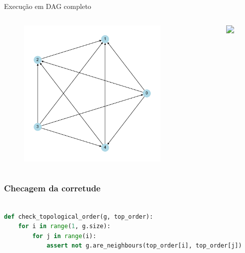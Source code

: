 \documentclass[aspectratio=169,usenames,dvipsnames]{beamer}
\begin{document}
\begin{frame}{Execução em DAG completo}

  \begin{columns}[t]
  \begin{figure}[ht]
  \centering
  \includegraphics[width=0.9\textwidth]{figs/dag_complete_5.pdf}
  \end{figure}
  \vfill
  \begin{figure}[h]
  \centering
  \includegraphics<2>[width=0.9\textwidth]{figs/dag_complete_top_5.png}
  \end{figure}
  \vfill
  \end{columns}
  
\end{frame}

\begin{frame}[fragile]  %
  \frametitle{Checagem da corretude}

      \begin{lstlisting}[language=Python, basicstyle=\ttfamily\small]

def check_topological_order(g, top_order):
    for i in range(1, g.size):
        for j in range(i):
            assert not g.are_neighbours(top_order[i], top_order[j])

      \end{lstlisting}

\end{frame}
\end{document}
